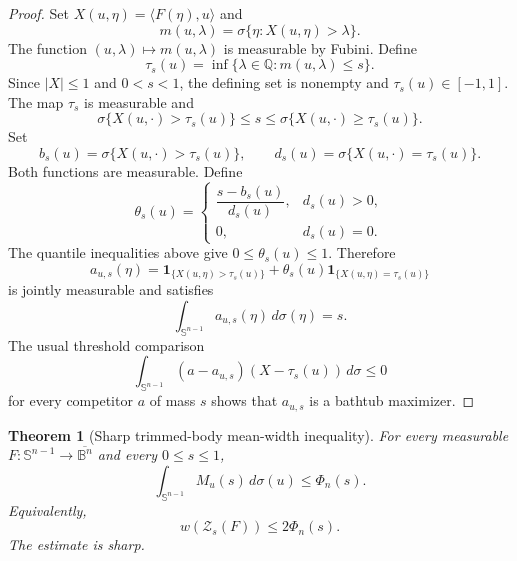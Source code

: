\documentclass[11pt,reqno]{amsart}
\newtheorem{theorem}{Theorem}[section]
\theoremstyle{remark}
\begin{document}
\begin{proof}
Set $X(u,\eta)=\langle F(\eta),u\rangle$ and
\[
 m(u,\lambda)=
 \sigma\{\eta:X(u,\eta)>\lambda\}.
\]
The function $(u,\lambda)\mapsto m(u,\lambda)$ is measurable by Fubini.
Define
\[
 \tau_s(u)=
 \inf\{\lambda\in\mathbb Q:m(u,\lambda)\le s\}.
\]
Since $|X|\le1$ and $0<s<1$, the defining set is nonempty and
$\tau_s(u)\in[-1,1]$.  The map $\tau_s$ is measurable and
\[
 \sigma\{X(u,\cdot)>\tau_s(u)\}
 \le s
 \le
 \sigma\{X(u,\cdot)\ge\tau_s(u)\}.
\]
Set
\[
 b_s(u)
 =
 \sigma\{X(u,\cdot)>\tau_s(u)\},
 \qquad
 d_s(u)
 =
 \sigma\{X(u,\cdot)=\tau_s(u)\}.
\]
Both functions are measurable.  Define
\[
 \theta_s(u)
 =
 \begin{cases}
 \dfrac{s-b_s(u)}{d_s(u)},& d_s(u)>0,\\[1ex]
 0,& d_s(u)=0.
 \end{cases}
\]
The quantile inequalities above give $0\le\theta_s(u)\le1$.  Therefore
\[
 a_{u,s}(\eta)
 =
 \mathbf1_{\{X(u,\eta)>\tau_s(u)\}}
 +
 \theta_s(u)\mathbf1_{\{X(u,\eta)=\tau_s(u)\}}
\]
is jointly measurable and satisfies
\[
 \int_{\mathbb S^{n-1}} a_{u,s}(\eta)\,d\sigma(\eta)=s.
\]
The usual threshold comparison
\[
 \int_{\mathbb S^{n-1}} (a-a_{u,s})(X-\tau_s(u))\,d\sigma\le0
\]
for every competitor $a$ of mass $s$ shows that $a_{u,s}$ is a bathtub
maximizer.
\end{proof}

\begin{theorem}[Sharp trimmed-body mean-width inequality]\label{thm:trimmed}
For every measurable
$F:\mathbb S^{n-1}\to\overline{\mathbb B^n}$ and every $0\le s\le1$,
\begin{equation}\label{eq:trimmedbound}
 \int_{\mathbb S^{n-1}}M_u(s)\,d\sigma(u)\le \Phi_n(s).
\end{equation}
Equivalently,
\[
 w(\mathcal Z_s(F))\le 2\Phi_n(s).
\]
The estimate is sharp.
\end{theorem}
\end{document}
